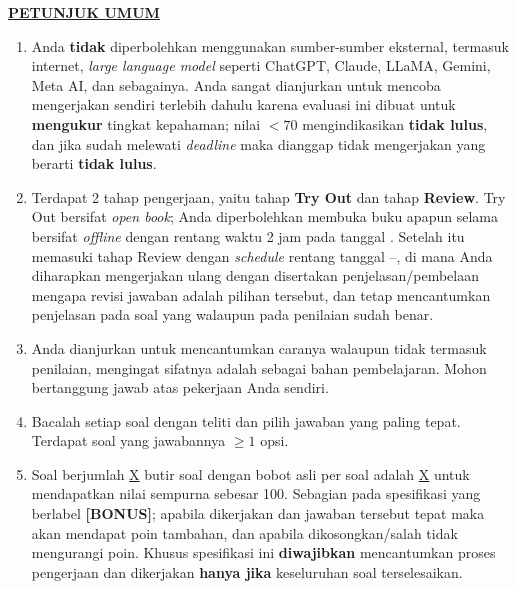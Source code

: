 \documentclass[11pt]{article}
\begin{document}
\noindent\textbf{\underline{PETUNJUK UMUM}}
\begin{enumerate}[leftmargin=*,itemsep=4pt,topsep=4pt]
  \item Anda \textbf{tidak} diperbolehkan menggunakan sumber-sumber eksternal,
        termasuk internet, \textit{large language model} seperti ChatGPT, Claude,
        LLaMA, Gemini, Meta AI, dan sebagainya. Anda sangat dianjurkan untuk
        mencoba mengerjakan sendiri terlebih dahulu karena evaluasi ini dibuat
        untuk \textbf{mengukur} tingkat kepahaman; nilai $<70$ mengindikasikan
        \textbf{tidak lulus}, dan jika sudah melewati \textit{deadline} maka
        dianggap tidak mengerjakan yang berarti \textbf{tidak lulus}.

  \item Terdapat 2 tahap pengerjaan, yaitu tahap \textbf{Try Out} dan tahap
        \textbf{Review}. Try Out bersifat \textit{open book}; Anda diperbolehkan
        membuka buku apapun selama bersifat \textit{offline} dengan rentang waktu
        2 jam pada tanggal \underline{\hspace{3cm}}. Setelah itu memasuki
        tahap Review dengan \textit{schedule} rentang tanggal
        \underline{\hspace{3cm}}--\underline{\hspace{3cm}}, di mana Anda
        diharapkan mengerjakan ulang dengan disertakan penjelasan/pembelaan
        mengapa revisi jawaban adalah pilihan tersebut, dan tetap mencantumkan
        penjelasan pada soal yang walaupun pada penilaian sudah benar.

  \item Anda dianjurkan untuk mencantumkan caranya walaupun tidak termasuk
        penilaian, mengingat sifatnya adalah sebagai bahan pembelajaran.
        Mohon bertanggung jawab atas pekerjaan Anda sendiri.

  \item Bacalah setiap soal dengan teliti dan pilih jawaban yang paling tepat.
        Terdapat soal yang jawabannya $\geq 1$ opsi.

  \item Soal berjumlah \underline{\;\;X\;\;} butir soal dengan bobot asli per
        soal adalah \underline{\;\;X\;\;} untuk mendapatkan nilai sempurna
        sebesar 100. Sebagian pada spesifikasi yang berlabel \textbf{[BONUS]};
        apabila dikerjakan dan jawaban tersebut tepat maka akan mendapat poin
        tambahan, dan apabila dikosongkan/salah tidak mengurangi poin. Khusus
        spesifikasi ini \textbf{diwajibkan} mencantumkan proses pengerjaan dan
        dikerjakan \textbf{hanya jika} keseluruhan soal terselesaikan.


\end{enumerate}
\end{document}
